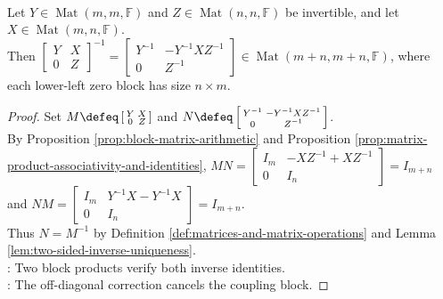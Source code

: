 \begin{proposition} \label{prop:block-upper-triangular-inverse} \\
Let $Y\in\operatorname{Mat}(m,m,\mathbb{F})$ and $Z\in\operatorname{Mat}(n,n,\mathbb{F})$ be invertible, and let $X\in\operatorname{Mat}(m,n,\mathbb{F})$.\\
Then $\left[\begin{smallmatrix}Y&X\\0&Z\end{smallmatrix}\right]^{-1}=\left[\begin{smallmatrix}Y^{-1}&-Y^{-1}XZ^{-1}\\0&Z^{-1}\end{smallmatrix}\right]\in\operatorname{Mat}(m+n,m+n,\mathbb{F})$, where each lower-left zero block has size $n\times m$.
\begin{proof}
Set $M\defeq\left[\begin{smallmatrix}Y&X\\0&Z\end{smallmatrix}\right]$ and $N\defeq\left[\begin{smallmatrix}Y^{-1}&-Y^{-1}XZ^{-1}\\0&Z^{-1}\end{smallmatrix}\right]$.\\
By Proposition \ref{prop:block-matrix-arithmetic} and Proposition \ref{prop:matrix-product-associativity-and-identities}, $MN=\left[\begin{smallmatrix}I_m&-XZ^{-1}+XZ^{-1}\\0&I_n\end{smallmatrix}\right]=I_{m+n}$ and $NM=\left[\begin{smallmatrix}I_m&Y^{-1}X-Y^{-1}X\\0&I_n\end{smallmatrix}\right]=I_{m+n}$.\\
Thus $N=M^{-1}$ by Definition \ref{def:matrices-and-matrix-operations} and Lemma \ref{lem:two-sided-inverse-uniqueness}.\\
: Two block products verify both inverse identities.\\
: The off-diagonal correction cancels the coupling block.
\end{proof}
\end{proposition}

